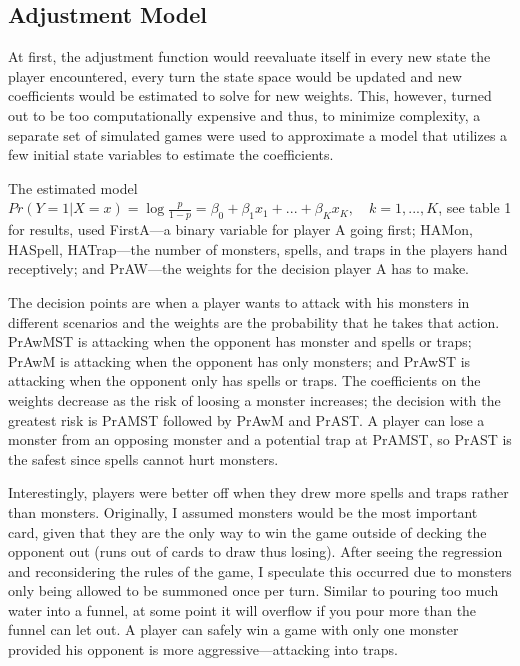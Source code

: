 
\subsection{Adjustment Model}
At first, the adjustment function would reevaluate itself in every new state the player encountered, every turn the state space would be updated and new coefficients would be estimated to solve for new weights. This, however, turned out to be too computationally expensive and thus, to minimize complexity, a separate set of simulated games were used to approximate a model that utilizes a few initial state variables to estimate the coefficients. 

The estimated model $Pr(Y=1 | X = x) = \log \frac{p}{1-p} = \beta_0 + \beta_1 x_1 + ... + \beta_K x_K, \quad k = 1,...,K$, see table 1 for results, used FirstA---a binary variable for player A going first; HAMon, HASpell, HATrap---the number of monsters, spells, and traps in the players hand receptively; and PrAW---the weights for the decision player A has to make. 

The decision points are when a player wants to attack with his monsters in different scenarios and the weights are the probability that he takes that action. PrAwMST is attacking when the opponent has monster and spells or traps; PrAwM is attacking when the opponent has only monsters; and PrAwST is attacking when the opponent only has spells or traps. The coefficients on the weights decrease as the risk of loosing a monster increases; the decision with the greatest risk is PrAMST followed by PrAwM and PrAST. A player can lose a monster from an opposing monster and a potential trap at PrAMST, so PrAST is the safest since spells cannot hurt monsters.

Interestingly, players were better off when they drew more spells and traps rather than monsters. Originally, I assumed monsters would be the most important card, given that they are the only way to win the game outside of decking the opponent out (runs out of cards to draw thus losing). After seeing the regression and reconsidering the rules of the game, I speculate this occurred due to monsters only being allowed to be summoned once per turn. Similar to pouring too much water into a funnel, at some point it will overflow if you pour more than the funnel can let out. A player can safely win a game with only one monster provided his opponent is more aggressive---attacking into traps. 

{\footnotesize

}

